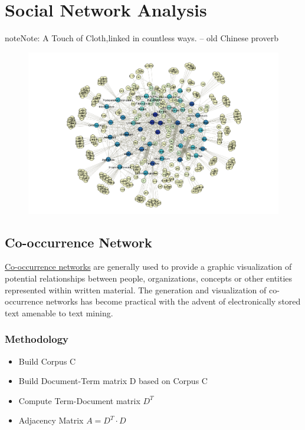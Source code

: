 \documentclass[letterpaper,11pt,english]{sphinxmanual}
\begin{document}
\chapter{Social Network Analysis}
\label{socialnetwork:socialnetwork}\label{socialnetwork:social-network-analysis}\label{socialnetwork::doc}\label{socialnetwork:id3}
\begin{notice}{note}{Note:}
A Touch of Cloth,linked in countless ways. -- old Chinese proverb
\end{notice}
\begin{figure}[htbp]
\centering

\includegraphics{net_work.png}
\end{figure}


\section{Co-occurrence Network}
\label{socialnetwork:co-occurrence-network}
\href{https://en.wikipedia.org/wiki/Co-occurrence\_networks}{Co-occurrence networks} are generally used to provide a graphic visualization of potential relationships between people, organizations, concepts or other entities represented within written material. The generation and visualization of co-occurrence networks has become practical with the advent of electronically stored text amenable to text mining.


\subsection{Methodology}
\label{socialnetwork:methodology}\begin{itemize}
\item {} 
Build Corpus C

\item {} 
Build Document-Term matrix D based on Corpus C

\item {} 
Compute Term-Document matrix \(D^T\)

\item {} 
Adjacency Matrix \(A =D^T\cdot D\)

\end{itemize}
\end{document}
